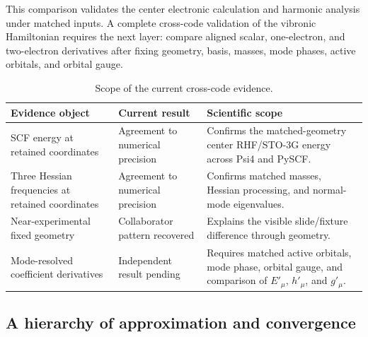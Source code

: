 \documentclass[10pt,twocolumn]{article}
\begin{document}
This comparison validates the center electronic calculation and harmonic
analysis under matched inputs.  A complete cross-code validation of the
vibronic Hamiltonian requires the next layer: compare aligned scalar,
one-electron, and two-electron derivatives after fixing geometry, basis,
masses, mode phases, active orbitals, and orbital gauge.

\begin{table}[t]
\centering
\caption{Scope of the current cross-code evidence.}
\small
\begin{tabular}{@{}p{}p{}p{}@{}}
\toprule
Evidence object & Current result & Scientific scope\\\midrule
SCF energy at retained coordinates &
Agreement to numerical precision &
Confirms the matched-geometry center RHF/STO-3G energy across Psi4 and PySCF.\\
Three Hessian frequencies at retained coordinates &
Agreement to numerical precision &
Confirms matched masses, Hessian processing, and normal-mode eigenvalues.\\
Near-experimental fixed geometry &
Collaborator pattern recovered &
Explains the visible slide/fixture difference through geometry.\\
Mode-resolved coefficient derivatives &
Independent result pending &
Requires matched active orbitals, mode phase, orbital gauge, and comparison of
$E'_\mu$, $h'_\mu$, and $g'_\mu$.\\
\bottomrule
\end{tabular}
\end{table}

\subsection*{A hierarchy of approximation and convergence}
\end{document}

